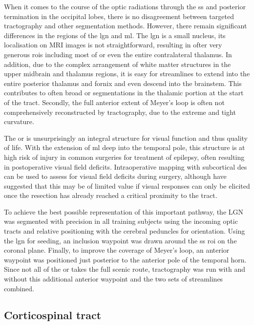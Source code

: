 When it comes to the course of the optic radiations through the \gls{ss} and posterior termination in the occipital lobes, there is no disagreement between targeted tractography and other segmentation methods.
However, there remain significant differences in the regions of the \gls{lgn} and \gls{ml}.
The \gls{lgn} is a small nucleus, its localisation on MRI images is not straightforward, resulting in ofter very generous \glspl{roi} including most of or even the entire contralateral thalamus.
In addition, due to the complex arrangement of white matter structures in the upper midbrain and thalamus regions, it is easy for streamlines to extend into the entire posterior thalamus and fornix and even descend into the brainstem.
This contributes to often broad \gls{or} segmentations in the thalamic portion at the start of the tract.
Secondly, the full anterior extent of Meyer's loop is often not comprehensively reconstructed by tractography, due to the extreme and tight curvature.\autocite{Lilja2015,Chamberland2018}

The \gls{or} is unsurprisingly an integral structure for visual function and thus quality of life.
With the extension of \gls{ml} deep into the temporal pole, this structure is at high risk of injury in common surgeries for treatment of epilepsy, often resulting in postoperative visual field deficits.\autocite{Lacerda2020}
Intraoperative mapping with subcortical \gls{des} can be used to assess for visual field deficits during surgery,\autocite{Duffau2004a,Mazerand2017} although \textcite{Shahar2018} have suggested that this may be of limited value if visual responses can only be elicited once the resection has already reached a critical proximity to the tract.

To achieve the best possible representation of this important pathway, the LGN was segmented with precision in all training subjects using the incoming optic tracts and relative positioning with the cerebral peduncles for orientation.
Using the \gls{lgn} for seeding, an inclusion waypoint was drawn around the \gls{ss} \gls{roi} on the coronal plane.
Finally, to improve the coverage of Meyer's loop, an anterior waypoint was positioned just posterior to the anterior pole of the temporal horn.
Since not all of the \gls{or} takes the full scenic route, tractography was run with and without this additional anterior waypoint and the two sets of streamlines combined.

\subsection{Corticospinal tract}

